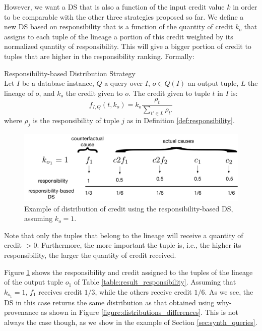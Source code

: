 However, we want a DS that is also a function of the input credit value $k$ in order to be comparable with the other three strategies proposed so far.
We define a new DS based on responsibility that is a function of the quantity of credit $k_o$ that assigns to each tuple of the lineage a portion of this credit weighted by its normalized quantity of responsibility.
This will give a bigger portion of credit to tuples that are higher in the responsibility ranking.
Formally:
\newline
\begin{definition}{Responsibility-based Distribution Strategy}\\
\label{def:resp_ds}
Let $I$ be a database instance, $Q$ a query over $I$, $o \in Q(I)$ an output tuple, $L$ the lineage of $o$, and $k_o$ the credit given to $o$. The credit given to tuple $t$ in $I$ is:
\[
	f_{I, Q}(t, k_o) = k_o \frac{\rho_t}{\sum_{t' \in L} \rho_{t'}}
\]
where $\rho_j$ is the responsibility of tuple $j$ as in Definition \ref{def:responsibility}.
\end{definition}


\begin{figure}[]
\centering
  \includegraphics[width=.7\textwidth]{figures/resp_example}
  \caption{Example of distribution of credit using 
    the responsibility-based DS, assuming $k_o = 1$.}
  \label{fig:resp_example}
\end{figure}

Note that only the tuples that belong to the lineage will receive a quantity of credit $> 0$. Furthermore, the more important the tuple is, i.e., the higher its responsibility, the larger the quantity of credit received. 

Figure \ref{fig:resp_example} shows the responsibility and credit assigned to the tuples of the lineage of the output tuple $o_1$ of Table \ref{table:result_responsibility}. 
Assuming that $k_{o_1} = 1$, $f_1$ receives credit $1/3$, while the others receive credit $1/6$. 
As we see, the DS in this case returns the same distribution as that obtained using why-provenance as shown in Figure \ref{figure:distributions_differences}.
This is not always the case though, as we show in the example of Section \ref{sec:synth_queries}.

